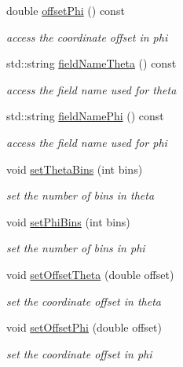 \begin{DoxyCompactItemize}
double \hyperlink{class_d_d4hep_1_1_d_d_segmentation_1_1_projective_cylinder_a4e44519136be4b1de822ca771b997f72}{offset\+Phi} () const
\begin{DoxyCompactList}\small\item\em access the coordinate offset in phi \end{DoxyCompactList}\item 
std\+::string \hyperlink{class_d_d4hep_1_1_d_d_segmentation_1_1_projective_cylinder_a17e968911533a752193d725dd3c03a99}{field\+Name\+Theta} () const
\begin{DoxyCompactList}\small\item\em access the field name used for theta \end{DoxyCompactList}\item 
std\+::string \hyperlink{class_d_d4hep_1_1_d_d_segmentation_1_1_projective_cylinder_a70a373f8532677593f46083a45dde6c5}{field\+Name\+Phi} () const
\begin{DoxyCompactList}\small\item\em access the field name used for phi \end{DoxyCompactList}\item 
void \hyperlink{class_d_d4hep_1_1_d_d_segmentation_1_1_projective_cylinder_a24dee799078dacde34e689b0b834e141}{set\+Theta\+Bins} (int bins)
\begin{DoxyCompactList}\small\item\em set the number of bins in theta \end{DoxyCompactList}\item 
void \hyperlink{class_d_d4hep_1_1_d_d_segmentation_1_1_projective_cylinder_a39fb4bdacbf4c6e929a2b3c70d51f7c4}{set\+Phi\+Bins} (int bins)
\begin{DoxyCompactList}\small\item\em set the number of bins in phi \end{DoxyCompactList}\item 
void \hyperlink{class_d_d4hep_1_1_d_d_segmentation_1_1_projective_cylinder_aa6c8515e197f47d176727c8fb6f935a0}{set\+Offset\+Theta} (double offset)
\begin{DoxyCompactList}\small\item\em set the coordinate offset in theta \end{DoxyCompactList}\item 
void \hyperlink{class_d_d4hep_1_1_d_d_segmentation_1_1_projective_cylinder_a0247ee2fcb59209e87206e4f2601b263}{set\+Offset\+Phi} (double offset)
\begin{DoxyCompactList}\small\item\em set the coordinate offset in phi \end{DoxyCompactList}\item 

\end{DoxyCompactItemize}

